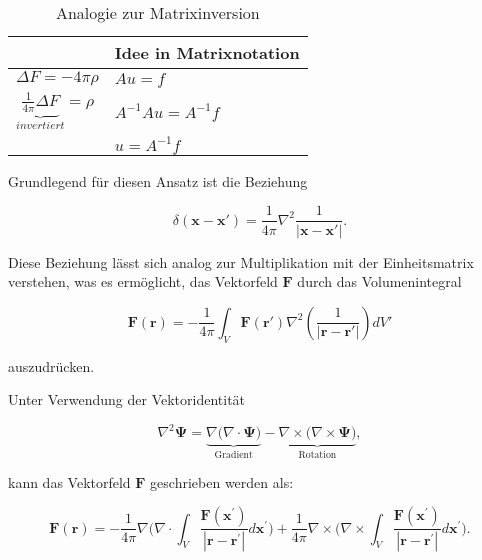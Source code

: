 \begin{table}
\centering
\begin{tabular}{l|l}
  & Idee in Matrixnotation \\
\hline
$\Delta F = -4 \pi \rho$  & $Au = f$ \\
$\underbrace{\frac{1}{4 \pi} \Delta F}_{invertiert} = \rho$ & $A^{-1}Au = A^{-1}f$  \\
 & $u = A^{-1}f$  \\
 \hline
\end{tabular}
\caption{Analogie zur Matrixinversion}
\label{tab:helmholtz_matrix_analogie}
\end{table}

\noindent Grundlegend für diesen Ansatz ist die Beziehung

\begin{equation}
\delta (\mathbf{x} - \mathbf{x'}) = \frac{1}{4 \pi} \nabla^2 \frac{1}{|\mathbf{x} - \mathbf{x'}|}.
\label{helmholtz:dirac}
\end{equation}

\noindent Diese Beziehung lässt sich analog zur Multiplikation mit der Einheitsmatrix verstehen, was es ermöglicht, das Vektorfeld $\mathbf{F}$ durch das Volumenintegral

\begin{equation}
\mathbf{F}(\mathbf{r}) = -\frac{1}{4\pi} \int_V \mathbf{F}(\mathbf{r}') \nabla^2 \left( \frac{1}{|\mathbf{r} - \mathbf{r}'|} \right) dV'
\end{equation}

\noindent auszudrücken.

\noindent Unter Verwendung der Vektoridentität

\begin{equation}
\nabla^2 \mathbf{\Psi}= \underbrace{\nabla \Big( \nabla \cdot \mathbf{\Psi} \Big)}_{\text{Gradient}} -\underbrace{\nabla \times \Big(\nabla \times \mathbf{\Psi} \Big)}_{\text{Rotation}},
\end{equation}

\noindent kann das Vektorfeld $\mathbf{F}$ geschrieben werden als:

\begin{equation}
\mathbf{F}(\mathbf{r}) = - \frac{1}{4 \pi} \nabla \bigg( \nabla \cdot \int_V \frac{\mathbf{F}(\mathbf{x}^{\prime})}{|\mathbf{r} - \mathbf{r}^{\prime}|} d\mathbf{x}^{\prime} \bigg) + \frac{1}{4 \pi} \nabla \times \bigg( \nabla \times \int_V \frac{\mathbf{F}(\mathbf{x}^{\prime})}{|\mathbf{r} - \mathbf{r}^{\prime}|} d\mathbf{x}^{\prime} \bigg).
\end{equation}

